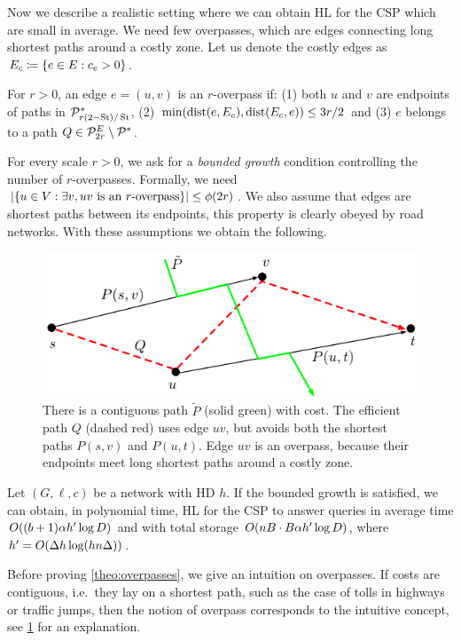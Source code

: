Now we describe a realistic setting where we can obtain HL for the CSP which are small in average.
We need few overpasses, which are edges connecting long shortest paths around a costly zone.
Let us denote the costly edges as $E_c\coloneqq\{e\in E:c_e>0\}$.

\begin{definition}[Overpass]
For $r>0$, an edge $e=(u,v)$ is an $r$-overpass if: (1) both $u$ and $v$ are endpoints of paths in $\mathcal{P}^*_{r(2-\operatorname{St})/\operatorname{St}}$, (2) $\min(\mbox{dist}(e,E_c),\mbox{dist}(E_c,e))\leq 3r/2$ and (3) $e$ belongs to a path $Q\in\mathcal{P}^E_{2r}\setminus\mathcal{P}^*$.
\end{definition} 

For every scale $r>0$, we ask for a \emph{bounded growth} condition controlling the number of $r$-overpasses.
Formally, we need $\lvert\{u\in V: \exists v, uv \text{ is an $r$-overpass}\}\rvert\leq \phi(2r)$.
We also assume that edges are shortest paths between its endpoints, this property is clearly obeyed by road networks.
With these assumptions we obtain the following.

\begin{figure}
\includegraphics[scale=0.6]{TexImg/overpass.pdf}
\caption{There is a contiguous path $\tilde P$ (solid green) with cost. 
The efficient path $Q$ (dashed red) uses edge $uv$, but avoids both the shortest paths $P(s,v)$ and $P(u,t)$.
Edge $uv$ is an overpass, because their endpoints meet long shortest paths around a costly zone.} 
\label{fig:overpass}
\end{figure}

\begin{theorem}\label{theo:overpasses}
Let $(G,\ell,c)$ be a network with HD $h$.
If the bounded growth is satisfied, we can obtain, in polynomial time, HL for the CSP to answer queries in average time $O((b+1)\alpha h'\log D)$ and with total storage $O(nB\cdot B\alpha h'\log D)$, where $h'=O(\Delta h\log(hn\Delta))$.
\end{theorem}

Before proving \cref{theo:overpasses}, we give an intuition on overpasses.
If costs are contiguous, i.e.\ they lay on a shortest path, such as the case of tolls in highways or traffic jumps, then the notion of overpass corresponds to the intuitive concept, see \cref{fig:overpass} for an explanation.


